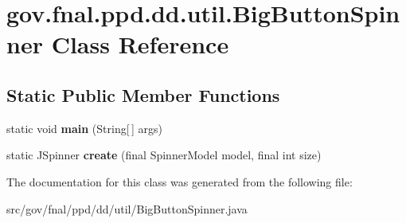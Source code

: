 \hypertarget{classgov_1_1fnal_1_1ppd_1_1dd_1_1util_1_1BigButtonSpinner}{\section{gov.\-fnal.\-ppd.\-dd.\-util.\-Big\-Button\-Spinner Class Reference}
\label{classgov_1_1fnal_1_1ppd_1_1dd_1_1util_1_1BigButtonSpinner}
}
\subsection*{Static Public Member Functions}
\begin{DoxyCompactItemize}
\item 
\hypertarget{classgov_1_1fnal_1_1ppd_1_1dd_1_1util_1_1BigButtonSpinner_a76b5b2bf2bcb5b597e60ed77541eccbd}{static void {\bfseries main} (String\mbox{[}$\,$\mbox{]} args)}\label{classgov_1_1fnal_1_1ppd_1_1dd_1_1util_1_1BigButtonSpinner_a76b5b2bf2bcb5b597e60ed77541eccbd}

\item 
\hypertarget{classgov_1_1fnal_1_1ppd_1_1dd_1_1util_1_1BigButtonSpinner_abcd688993adeb37dd0e0986507cb74fe}{static J\-Spinner {\bfseries create} (final Spinner\-Model model, final int size)}\label{classgov_1_1fnal_1_1ppd_1_1dd_1_1util_1_1BigButtonSpinner_abcd688993adeb37dd0e0986507cb74fe}

\end{DoxyCompactItemize}


The documentation for this class was generated from the following file\-:\begin{DoxyCompactItemize}
\item 
src/gov/fnal/ppd/dd/util/Big\-Button\-Spinner.\-java\end{DoxyCompactItemize}
